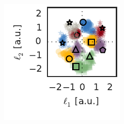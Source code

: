\begin{figure}[t!]
\begin{subfigure}[b]{1.6in}
    \label{fig:rgc_dist}
  \end{subfigure}
  ~
  \begin{subfigure}[b]{1.6in}
    \centering
    \caption{}
    \vspace{-.2in}
    \includegraphics[width=\textwidth]{figures/ch5/rgc_on_locations.pdf}
    \label{fig:rgc_locs}
  \end{subfigure}
  \\
  \vspace{-.2in}
  \begin{subfigure}[b]{1.85in}
    \centering
    \caption{}
    \vspace{-.2in}

\end{subfigure}
\end{figure}
